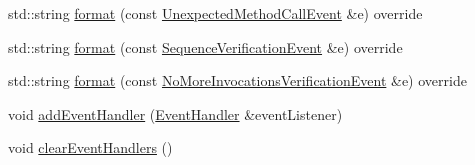 \begin{DoxyCompactItemize}
\item 
std\+::string \mbox{\hyperlink{structfakeit_1_1FakeitContext_a4da398d63e45c922606bbd5aaff30f6e}{format}} (const \mbox{\hyperlink{structfakeit_1_1UnexpectedMethodCallEvent}{Unexpected\+Method\+Call\+Event}} \&e) override
\item 
std\+::string \mbox{\hyperlink{structfakeit_1_1FakeitContext_af163c4c51929ef14c1c5529f2f42c40b}{format}} (const \mbox{\hyperlink{structfakeit_1_1SequenceVerificationEvent}{Sequence\+Verification\+Event}} \&e) override
\item 
std\+::string \mbox{\hyperlink{structfakeit_1_1FakeitContext_a49fae6e849a57fff6906a1a313fb4267}{format}} (const \mbox{\hyperlink{structfakeit_1_1NoMoreInvocationsVerificationEvent}{No\+More\+Invocations\+Verification\+Event}} \&e) override
\item 
void \mbox{\hyperlink{structfakeit_1_1FakeitContext_a176ad0df1fcb2758648f2c9b6c8fdd0d}{add\+Event\+Handler}} (\mbox{\hyperlink{structfakeit_1_1EventHandler}{Event\+Handler}} \&event\+Listener)
\item 
void \mbox{\hyperlink{structfakeit_1_1FakeitContext_a65960b8d910f35fa5c3f596f693e5c17}{clear\+Event\+Handlers}} ()
\end{DoxyCompactItemize}
